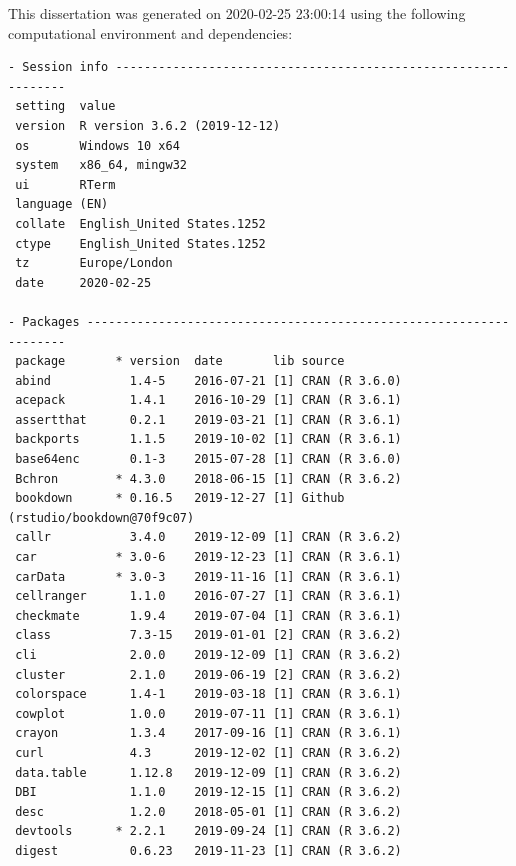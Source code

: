 \documentclass[12pt,twoside]{reedthesis}
\begin{document}
This dissertation was generated on 2020-02-25 23:00:14 using the following computational environment and dependencies:
\begin{verbatim}
- Session info ---------------------------------------------------------------
 setting  value                       
 version  R version 3.6.2 (2019-12-12)
 os       Windows 10 x64              
 system   x86_64, mingw32             
 ui       RTerm                       
 language (EN)                        
 collate  English_United States.1252  
 ctype    English_United States.1252  
 tz       Europe/London               
 date     2020-02-25                  

- Packages -------------------------------------------------------------------
 package       * version  date       lib source                            
 abind           1.4-5    2016-07-21 [1] CRAN (R 3.6.0)                    
 acepack         1.4.1    2016-10-29 [1] CRAN (R 3.6.1)                    
 assertthat      0.2.1    2019-03-21 [1] CRAN (R 3.6.1)                    
 backports       1.1.5    2019-10-02 [1] CRAN (R 3.6.1)                    
 base64enc       0.1-3    2015-07-28 [1] CRAN (R 3.6.0)                    
 Bchron        * 4.3.0    2018-06-15 [1] CRAN (R 3.6.2)                    
 bookdown      * 0.16.5   2019-12-27 [1] Github (rstudio/bookdown@70f9c07) 
 callr           3.4.0    2019-12-09 [1] CRAN (R 3.6.2)                    
 car           * 3.0-6    2019-12-23 [1] CRAN (R 3.6.1)                    
 carData       * 3.0-3    2019-11-16 [1] CRAN (R 3.6.1)                    
 cellranger      1.1.0    2016-07-27 [1] CRAN (R 3.6.1)                    
 checkmate       1.9.4    2019-07-04 [1] CRAN (R 3.6.1)                    
 class           7.3-15   2019-01-01 [2] CRAN (R 3.6.2)                    
 cli             2.0.0    2019-12-09 [1] CRAN (R 3.6.2)                    
 cluster         2.1.0    2019-06-19 [2] CRAN (R 3.6.2)                    
 colorspace      1.4-1    2019-03-18 [1] CRAN (R 3.6.1)                    
 cowplot         1.0.0    2019-07-11 [1] CRAN (R 3.6.1)                    
 crayon          1.3.4    2017-09-16 [1] CRAN (R 3.6.1)                    
 curl            4.3      2019-12-02 [1] CRAN (R 3.6.2)                    
 data.table      1.12.8   2019-12-09 [1] CRAN (R 3.6.2)                    
 DBI             1.1.0    2019-12-15 [1] CRAN (R 3.6.2)                    
 desc            1.2.0    2018-05-01 [1] CRAN (R 3.6.2)                    
 devtools      * 2.2.1    2019-09-24 [1] CRAN (R 3.6.2)                    
 digest          0.6.23   2019-11-23 [1] CRAN (R 3.6.2)                    

\end{verbatim}
\end{document}
